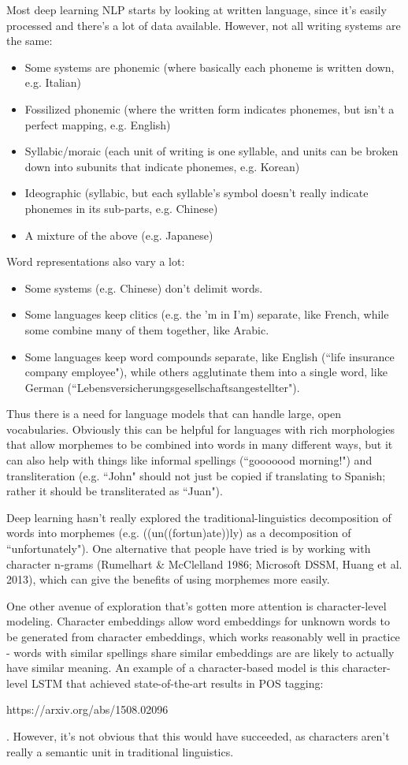 Most deep learning NLP starts by looking at written language, since it's easily processed and there's a lot of data available. However, not all writing systems are the same:
\begin{itemize}
\item Some systems are phonemic (where basically each phoneme is written down, e.g. Italian)
\item Fossilized phonemic (where the written form indicates phonemes, but isn't a perfect mapping, e.g. English)
\item Syllabic/moraic (each unit of writing is one syllable, and units can be broken down into subunits that indicate phonemes, e.g. Korean)
\item Ideographic (syllabic, but each syllable's symbol doesn't really indicate phonemes in its sub-parts, e.g. Chinese)
\item A mixture of the above (e.g. Japanese)
\end{itemize}
Word representations also vary a lot:
\begin{itemize}
\item Some systems (e.g. Chinese) don't delimit words.
\item Some languages keep clitics (e.g. the 'm in I'm) separate, like French, while some combine many of them together, like Arabic.
\item Some languages keep word compounds separate, like English (``life insurance company employee"), while others agglutinate them into a single word, like German (``Lebensversicherungsgesellschaftsangestellter").
\end{itemize}
Thus there is a need for language models that can handle large, open vocabularies. Obviously this can be helpful for languages with rich morphologies that allow morphemes to be combined into words in many different ways, but it can also help with things like informal spellings (``gooooood morning!") and transliteration (e.g. ``John" should not just be copied if translating to Spanish; rather it should be transliterated as ``Juan").

Deep learning hasn't really explored the traditional-linguistics decomposition of words into morphemes (e.g. ((un((fortun)ate))ly) as a decomposition of ``unfortunately"). One alternative that people have tried is by working with character n-grams (Rumelhart \& McClelland 1986; Microsoft DSSM, Huang et al. 2013), which can give the benefits of using morphemes more easily.

One other avenue of exploration that's gotten more attention is character-level modeling. Character embeddings allow word embeddings for unknown words to be generated from character embeddings, which works reasonably well in practice - words with similar spellings share similar embeddings are are likely to actually have similar meaning. An example of a character-based model is this character-level LSTM that achieved state-of-the-art results in POS tagging: \begin{tt}https://arxiv.org/abs/1508.02096\end{tt}. However, it's not obvious that this would have succeeded, as characters aren't really a semantic unit in traditional linguistics. 

